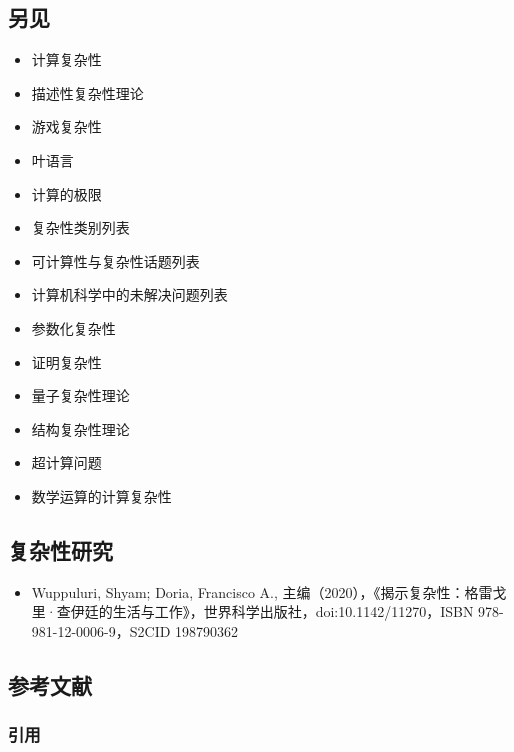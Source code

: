 \subsection{另见}
\begin{itemize}
\item 计算复杂性
\item 描述性复杂性理论
\item 游戏复杂性
\item 叶语言
\item 计算的极限
\item 复杂性类别列表
\item 可计算性与复杂性话题列表
\item 计算机科学中的未解决问题列表
\item 参数化复杂性
\item 证明复杂性
\item 量子复杂性理论
\item 结构复杂性理论
\item 超计算问题
\item 数学运算的计算复杂性
\end{itemize}
\subsection{复杂性研究}
\begin{itemize}
\item Wuppuluri, Shyam; Doria, Francisco A., 主编（2020），《揭示复杂性：格雷戈里·查伊廷的生活与工作》，世界科学出版社，doi:10.1142/11270，ISBN 978-981-12-0006-9，S2CID 198790362
\end{itemize}
\subsection{参考文献}
\subsubsection{引用}

